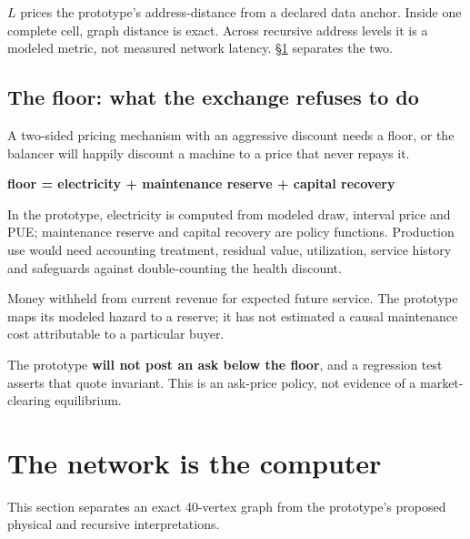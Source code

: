 \documentclass[11pt,letterpaper]{article}
\newcommand{\tagbox}[3]{\tikz[baseline=(X.base)]{\node[inner xsep=3.5pt,inner ysep=1.4pt,rounded corners=1.6pt,fill=#1,text=#2,font=\bfseries\sffamily\tiny] (X) {#3};}}
\newcommand{\MODELLED}{\tagbox{amberlite}{amber!55!black}{MODELLED}}
\begin{document}
$L$ prices the prototype's address-distance from a declared data anchor. Inside
one complete cell, graph distance is exact. Across recursive address levels it
is a modeled metric, not measured network latency. \S\ref{sec:fabric} separates
the two.

\subsection{The floor: what the exchange refuses to do}

A two-sided pricing mechanism with an aggressive discount needs a floor, or the
balancer will happily discount a machine to a price that never repays it.

\begin{center}
\begin{tcolorbox}[enhanced,colback=white,colframe=navy,boxrule=1pt,arc=2pt,width=0.94\textwidth,halign=center]
\textbf{floor \;=\; electricity \;+\; maintenance reserve \;+\; capital recovery}
\end{tcolorbox}
\end{center}

In the prototype, electricity is computed from modeled draw, interval price and
PUE; maintenance reserve and capital recovery are policy functions. \MODELLED{}
Production use would need accounting treatment, residual value, utilization,
service history and safeguards against double-counting the health discount.

\begin{plainbox}
Money withheld from current revenue for expected future service. The prototype
maps its modeled hazard to a reserve; it has not estimated a causal maintenance
cost attributable to a particular buyer.
\end{plainbox}

The prototype \textbf{will not post an ask below the floor}, and a regression
test asserts that quote invariant. This is an ask-price policy, not evidence of
a market-clearing equilibrium.

\newpage

\section{The network is the computer}
\label{sec:fabric}

This section separates an exact 40-vertex graph from the prototype's proposed
physical and recursive interpretations.
\end{document}
